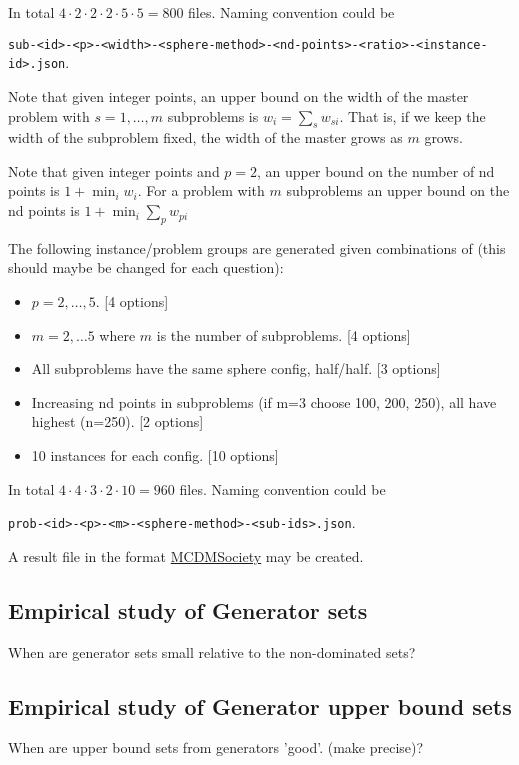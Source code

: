 In total $4 \cdot 2 \cdot 2 \cdot 2 \cdot 5 \cdot 5 = 800$ files. Naming convention could be 

\verb|sub-<id>-<p>-<width>-<sphere-method>-<nd-points>-<ratio>-<instance-id>.json|.


Note that given integer points, an upper bound on the width of the master problem with $s = 1,\ldots, m$ subproblems is $w_i = \sum_s w_{si}$. That is, if we keep the width of the subproblem fixed, the width of the master grows as $m$ grows. 

Note that given integer points and $p=2$, an upper bound on the number of nd points is $1 + \min_i w_i$. For a problem with $m$ subproblems an upper bound on the nd points is $1 + \min_i \sum_p w_{pi}$

The following instance/problem groups are generated given combinations of (this should maybe be changed for each question):

\begin{itemize}
    \item $p=2,\ldots, 5$. [4 options]
    \item $m=2,\ldots 5$ where $m$ is the number of subproblems. [4 options]
    \item All subproblems have the same sphere config, half/half. [3 options]
    \item Increasing nd points in subproblems (if m=3 choose 100, 200, 250), all have highest (n=250). [2 options]
    \item 10 instances for each config. [10 options]
\end{itemize}

In total $4 \cdot 4 \cdot 3 \cdot 2 \cdot 10 = 960$ files. Naming convention could be 

\verb|prob-<id>-<p>-<m>-<sphere-method>-<sub-ids>.json|.

A result file in the format \href{https://github.com/MCDMSociety/MOrepo/blob/master/contribute.md}{MCDMSociety}   may be created.



\subsection{Empirical study of Generator sets}
When are generator sets small relative to the non-dominated sets?

\subsection{Empirical study of Generator upper bound sets}
When are upper bound sets from generators 'good'. (make precise)?


